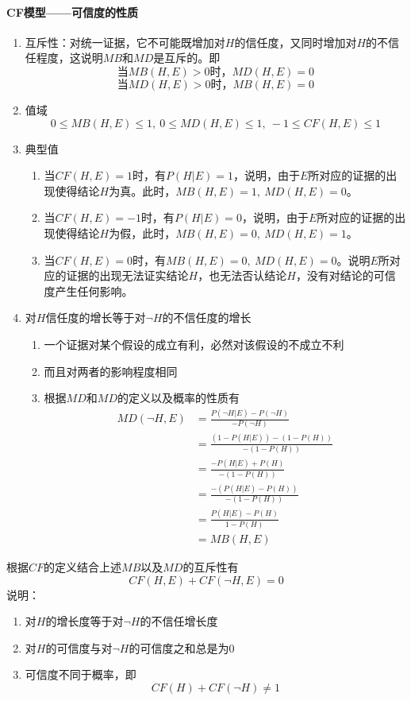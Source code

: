 \documentclass[12pt]{article}
\begin{document}
\paragraph{CF模型——可信度的性质}
\begin{enumerate}
	\item{互斥性：对统一证据，它不可能既增加对$H$的信任度，又同时增加对$H$的不信任程度，这说明$MB$和$MD$是互斥的。即
			$$当MB(H,E)>0时，MD(H,E)=0$$
			$$当MD(H,E)>0时，MB(H,E)=0$$}
	\item{值域
				$$0\leq MB(H,E)\leq 1,\ 0\leq MD(H,E)\leq 1,\ -1\leq CF(H,E)\leq 1$$}
	\item{典型值
			\begin{enumerate}
				\item{当$CF(H,E)=1$时，有$P(H|E)=1$，说明，由于$E$所对应的证据的出现使得结论$H$为真。此时，$MB(H,E)=1,\ MD(H,E)=0$。}
				\item{当$CF(H,E)=-1$时，有$P(H|E)=0$，说明，由于$E$所对应的证据的出现使得结论$H$为假，此时，$MB(H,E)=0,\ MD(H,E)=1$。}
				\item{当$CF(H,E)=0$时，有$MB(H,E)=0,\ MD(H,E)=0$。说明$E$所对应的证据的出现无法证实结论$H$，也无法否认结论$H$，没有对结论的可信度产生任何影响。}
			\end{enumerate}
		}
	\item{对$H$信任度的增长等于对$\neg{H}$的不信任度的增长
			\begin{enumerate}
				\item{一个证据对某个假设的成立有利，必然对该假设的不成立不利}
				\item{而且对两者的影响程度相同}
				\item{根据$MD$和$MD$的定义以及概率的性质有
						$$\begin{aligned}
							MD(\neg{H},E)&=\frac{P(\neg{H}|E)-P(\neg{H})}{-P(\neg{H})}\\
							\ &=\frac{(1-P(H|E))-(1-P(H))}{-(1-P(H))}\\
							\ &=\frac{-P(H|E)+P(H)}{-(1-P(H))}\\
							\ &=\frac{-(P(H|E)-P(H))}{-(1-P(H))}\\
							\ &=\frac{P(H|E)-P(H)}{1-P(H)}\\
							\ &=MB(H,E)
						\end{aligned}$$
					}
			\end{enumerate}
		}
\end{enumerate}
根据$CF$的定义结合上述$MB$以及$MD$的互斥性有
$$CF(H,E)+CF(\neg{H},E)=0$$
说明：
\begin{enumerate}
	\item{对$H$的增长度等于对$\neg{H}$的不信任增长度}
	\item{对$H$的可信度与对$\neg{H}$的可信度之和总是为0}
	\item{可信度不同于概率，即
			$$CF(H)+CF(\neg{H})\neq{1}$$
		}
\end{enumerate}
\end{document}
